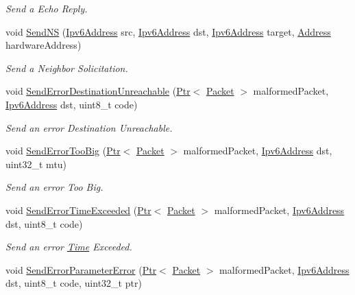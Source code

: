 \begin{DoxyCompactItemize}
\begin{DoxyCompactList}\small\item\em Send a Echo Reply. \end{DoxyCompactList}\item 
void \hyperlink{classns3_1_1Icmpv6L4Protocol_aacd8a4ff185f48e74f4c4b8dc0da4398}{Send\+NS} (\hyperlink{classns3_1_1Ipv6Address}{Ipv6\+Address} src, \hyperlink{classns3_1_1Ipv6Address}{Ipv6\+Address} dst, \hyperlink{classns3_1_1Ipv6Address}{Ipv6\+Address} target, \hyperlink{classns3_1_1Address}{Address} hardware\+Address)
\begin{DoxyCompactList}\small\item\em Send a Neighbor Solicitation. \end{DoxyCompactList}\item 
void \hyperlink{classns3_1_1Icmpv6L4Protocol_aa54ff6a5f2486f62dc15aa657dd947a0}{Send\+Error\+Destination\+Unreachable} (\hyperlink{classns3_1_1Ptr}{Ptr}$<$ \hyperlink{classns3_1_1Packet}{Packet} $>$ malformed\+Packet, \hyperlink{classns3_1_1Ipv6Address}{Ipv6\+Address} dst, uint8\+\_\+t code)
\begin{DoxyCompactList}\small\item\em Send an error Destination Unreachable. \end{DoxyCompactList}\item 
void \hyperlink{classns3_1_1Icmpv6L4Protocol_a103bf3fdf3212b7fdd351d89adac59d7}{Send\+Error\+Too\+Big} (\hyperlink{classns3_1_1Ptr}{Ptr}$<$ \hyperlink{classns3_1_1Packet}{Packet} $>$ malformed\+Packet, \hyperlink{classns3_1_1Ipv6Address}{Ipv6\+Address} dst, uint32\+\_\+t mtu)
\begin{DoxyCompactList}\small\item\em Send an error Too Big. \end{DoxyCompactList}\item 
void \hyperlink{classns3_1_1Icmpv6L4Protocol_a0912f3bc9bfb032dafe0c295e2dcb047}{Send\+Error\+Time\+Exceeded} (\hyperlink{classns3_1_1Ptr}{Ptr}$<$ \hyperlink{classns3_1_1Packet}{Packet} $>$ malformed\+Packet, \hyperlink{classns3_1_1Ipv6Address}{Ipv6\+Address} dst, uint8\+\_\+t code)
\begin{DoxyCompactList}\small\item\em Send an error \hyperlink{classns3_1_1Time}{Time} Exceeded. \end{DoxyCompactList}\item 
void \hyperlink{classns3_1_1Icmpv6L4Protocol_a5ab4894cdec7b35c4c43f0ee82d61aa6}{Send\+Error\+Parameter\+Error} (\hyperlink{classns3_1_1Ptr}{Ptr}$<$ \hyperlink{classns3_1_1Packet}{Packet} $>$ malformed\+Packet, \hyperlink{classns3_1_1Ipv6Address}{Ipv6\+Address} dst, uint8\+\_\+t code, uint32\+\_\+t ptr)

\end{DoxyCompactItemize}
